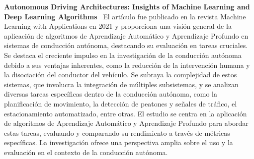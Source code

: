 \textbf{Autonomous Driving Architectures: Insights of Machine Learning and Deep Learning Algorithms}~\cite{bachute2021autonomous}
El artículo fue publicado en la revista Machine Learning with Applications en 2021 y
proporciona una visión general de la aplicación de algoritmos de Aprendizaje Automático y Aprendizaje Profundo
en sistemas de conducción autónoma, destacando su evaluación en tareas cruciales.
Se destaca el creciente impulso en la investigación de la conducción autónoma debido a sus ventajas inherentes, como la reducción
de la intervención humana y la disociación del conductor del vehículo.
Se subraya la complejidad de estos sistemas,
que involucra la integración de múltiples subsistemas, y se analizan diversas tareas específicas dentro de la conducción autónoma,
como la planificación de movimiento, la detección de peatones y señales de tráfico, el estacionamiento automatizado, entre otras.
El estudio se centra en la aplicación de algoritmos de Aprendizaje Automático y Aprendizaje Profundo para abordar estas tareas,
evaluando y comparando su rendimiento a través de métricas específicas. La investigación ofrece una perspectiva amplia sobre el uso
y la evaluación en el contexto de la conducción autónoma.
